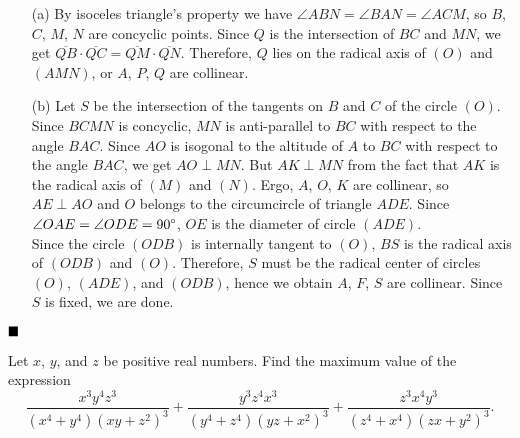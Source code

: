 \documentclass[11pt]{article}
\newenvironment{solution}[1][Solution]{%
  \proof[\normalfont \faPenNib \hspace{0.2cm} \ttfamily \scshape \large #1]%
}{\(\hfill \blacksquare\){\parfillskip0pt\par}}
\theoremstyle{definition}
\begin{document}
        \begin{solution}
            \hfill
            \begin{enumerate}
                \item[(a)] By isoceles triangle's property we have \(\angle ABN = \angle BAN = \angle ACM\), so \(B\), \(C\), \(M\), \(N\) are concyclic points. Since \(Q\) is the intersection of \(BC\) and \(MN\), we get \(\overline{QB} \cdot \overline{QC} = \overline{QM} \cdot \overline{QN}\). Therefore, \(Q\) lies on the radical axis of \((O)\) and \((AMN)\), or \(A\), \(P\), \(Q\) are collinear.
                
                \item[(b)] Let \(S\) be the intersection of the tangents on \(B\) and \(C\) of the circle \((O)\).\\
                Since \(BCMN\) is concyclic, \(MN\) is anti-parallel to \(BC\) with respect to the angle \(BAC\). Since \(AO\) is isogonal to the altitude of \(A\) to \(BC\) with respect to the angle \(BAC\), we get \(AO \perp MN\). But \(AK \perp MN\) from the fact that \(AK\) is the radical axis of \((M)\) and \((N)\). Ergo, \(A\), \(O\), \(K\) are collinear, so \(AE \perp AO\) and \(O\) belongs to the circumcircle of triangle \(ADE\). Since \(\angle OAE = \angle ODE = 90 \degree\), \(OE\) is the diameter of circle \((ADE)\).\\
                Since the circle \((ODB)\) is internally tangent to \((O)\), \(BS\) is the radical axis of \((ODB)\) and \((O)\). Therefore, \(S\) must be the radical center of circles \((O)\), \((ADE)\), and \((ODB)\), hence we obtain \(A\), \(F\), \(S\) are collinear. Since \(S\) is fixed, we are done.
            \end{enumerate}
        \end{solution}

        \newpage

        \begin{problem}
            Let \(x\), \(y\), and \(z\) be positive real numbers. Find the maximum value of the expression
            \[\frac{x^3y^4z^3}{(x^4 + y^4)(xy + z^2)^3} + \frac{y^3z^4x^3}{(y^4 + z^4)(yz + x^2)^3} + \frac{z^3x^4y^3}{(z^4 + x^4)(zx + y^2)^3}.\]
        \end{problem}
\end{document}
